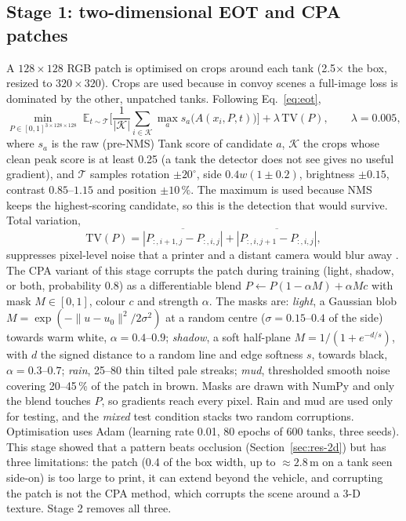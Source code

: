 \documentclass[11pt,a4paper]{article}
\begin{document}
\subsection{Stage 1: two-dimensional EOT and CPA patches}\label{sec:2d}
A $128\times128$ RGB patch is optimised on crops around each tank (2.5$\times$ the box, resized to $320\times320$). Crops are used because in convoy scenes a full-image loss is dominated by the other, unpatched tanks. Following Eq.~\eqref{eq:eot},
\begin{equation}
\min_{P\in[0,1]^{3\times128\times128}}\;\mathbb{E}_{t\sim\mathcal{T}}\Big[\frac{1}{|\mathcal{K}|}\sum_{i\in\mathcal{K}}\max_a s_a\big(A(x_i,P,t)\big)\Big]+\lambda\,\mathrm{TV}(P),\qquad\lambda=0.005,\label{eq:eot}
\end{equation}
where $s_a$ is the raw (pre-NMS) Tank score of candidate $a$, $\mathcal{K}$ the crops whose clean peak score is at least 0.25 (a tank the detector does not see gives no useful gradient), and $\mathcal{T}$ samples rotation $\pm20^\circ$, side $0.4w(1\pm0.2)$, brightness $\pm0.15$, contrast $0.85$--$1.15$ and position $\pm10\,\%$. The maximum is used because NMS keeps the highest-scoring candidate, so this is the detection that would survive. Total variation,
\begin{equation}
\mathrm{TV}(P)=\overline{|P_{:,i+1,j}-P_{:,i,j}|}+\overline{|P_{:,i,j+1}-P_{:,i,j}|},
\end{equation}
suppresses pixel-level noise that a printer and a distant camera would blur away \cite{sharif2016}. The CPA variant of this stage corrupts the patch during training (light, shadow, or both, probability 0.8) as a differentiable blend $P\leftarrow P(1-\alpha M)+\alpha Mc$ with mask $M\in[0,1]$, colour $c$ and strength $\alpha$. The masks are: \emph{light}, a Gaussian blob $M=\exp(-\|u-u_0\|^2/2\sigma^2)$ at a random centre ($\sigma=0.15$--$0.4$ of the side) towards warm white, $\alpha=0.4$--$0.9$; \emph{shadow}, a soft half-plane $M=1/(1+e^{-d/s})$, with $d$ the signed distance to a random line and edge softness $s$, towards black, $\alpha=0.3$--$0.7$; \emph{rain}, 25--80 thin tilted pale streaks; \emph{mud}, thresholded smooth noise covering 20--45\,\% of the patch in brown. Masks are drawn with NumPy and only the blend touches $P$, so gradients reach every pixel. Rain and mud are used only for testing, and the \emph{mixed} test condition stacks two random corruptions. Optimisation uses Adam (learning rate 0.01, 80 epochs of 600 tanks, three seeds). This stage showed that a pattern beats occlusion (Section~\ref{sec:res-2d}) but has three limitations: the patch (0.4 of the box width, up to $\approx2.8$\,m on a tank seen side-on) is too large to print, it can extend beyond the vehicle, and corrupting the patch is not the CPA method, which corrupts the scene around a 3-D texture. Stage 2 removes all three.
\end{document}
